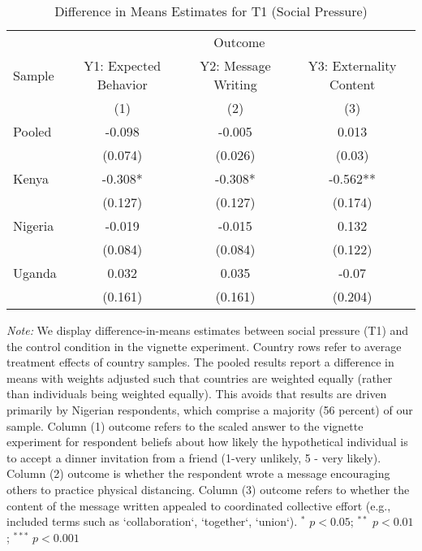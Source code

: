 \begin{table}[htb]
\centering
\caption{Difference in Means Estimates for T1 (Social Pressure)} 
\label{tab_dim_soc}
\begin{tabular}{lccc}
\hline\hline & \multicolumn{3}{c}{Outcome} \\
Sample & Y1: Expected Behavior & Y2: Message Writing & Y3: Externality Content \\ 
& (1) & (2) & (3) \\ \hline
Pooled & -0.098 & -0.005 & 0.013 \\ 
   & (0.074) & (0.026) & (0.03) \\ 
  Kenya & -0.308* & -0.308* & -0.562** \\ 
   & (0.127) & (0.127) & (0.174) \\ 
  Nigeria & -0.019 & -0.015 & 0.132 \\ 
   & (0.084) & (0.084) & (0.122) \\ 
  Uganda & 0.032 & 0.035 & -0.07 \\ 
   & (0.161) & (0.161) & (0.204) \\ 
   \hline
\end{tabular}
\begin{flushleft}\textit{Note:} We display difference-in-means estimates between social pressure (T1) and the control condition in the vignette experiment. Country rows refer to average treatment effects of country samples. The pooled results report a difference in means with weights adjusted such that countries are weighted equally (rather than individuals being weighted equally). This avoids that results are driven primarily by Nigerian respondents, which comprise a majority (56 percent) of our sample. Column (1) outcome refers to the scaled answer to the vignette experiment for respondent beliefs about how likely the hypothetical individual is to accept a dinner invitation from a friend (1-very unlikely, 5 - very likely). Column (2) outcome is whether the respondent wrote a message encouraging others to practice physical distancing.  Column (3) outcome refers to whether the content of the message written appealed to coordinated collective effort (e.g., included terms such as `collaboration`, `together`, `union`). $^{*}$ $p<0.05$; $^{**}$ $p<0.01$; $^{***}$ $p<0.001$  \end{flushleft}
\end{table}
